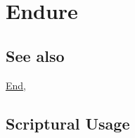 \section{Endure}
	\label{ENDURE}
	
\subsection{See also}

	\hyperref[END]{End}, 





\subsection{Scriptural Usage} %
	\label{ENDURE-SCRIPTURES}

	
	
